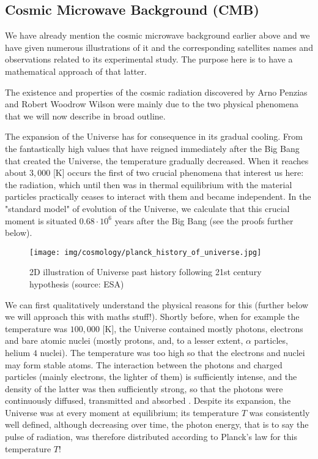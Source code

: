 	\pagebreak
	\subsection{Cosmic Microwave Background (CMB)}
	We have already mention the cosmic microwave background earlier above and we have given numerous illustrations of it and the corresponding satellites names and observations related to its experimental study. The purpose here is to have a mathematical approach of that latter.
	
	The existence and properties of the cosmic radiation discovered by Arno Penzias and Robert Woodrow Wilson were mainly due to the two physical phenomena that we will now describe in broad outline.

	The expansion of the Universe has for consequence in its gradual cooling. From the fantastically high values that have reigned immediately after the Big Bang that created the Universe, the temperature gradually decreased. When it reaches about $3,000$ [K] occurs the first of two crucial phenomena that interest us here: the radiation, which until then was in thermal equilibrium with the material particles practically ceases to interact with them and became independent. In the "standard model" of evolution of the Universe, we calculate that this crucial moment is situated $0.68\cdot 10^6$ years after the Big Bang (see the proofs further below).
	\begin{figure}[H]
		\centering
		\texttt{[image: img/cosmology/planck\_history\_of\_universe.jpg]}
		\caption{2D illustration of Universe past history following 21st century hypothesis (source: ESA)}
	\end{figure}
	We can first qualitatively understand the physical reasons for this (further below we will approach this with maths stuff!). Shortly before, when for example the temperature was $100,000$ [K], the Universe contained mostly photons, electrons and bare atomic nuclei (mostly protons, and, to a lesser extent, $\alpha$ particles, helium $4$ nuclei). The temperature was too high so that the electrons and nuclei may form stable atoms. The interaction between the photons and charged particles (mainly electrons, the lighter of them) is sufficiently intense, and the density of the latter was then sufficiently strong, so that the photons were continuously diffused, transmitted and absorbed . Despite its expansion, the Universe was at every moment at equilibrium; its temperature $T$ was consistently well defined, although decreasing over time, the photon energy, that is to say the pulse of radiation, was therefore distributed according to Planck's law for this temperature $T$!
	
